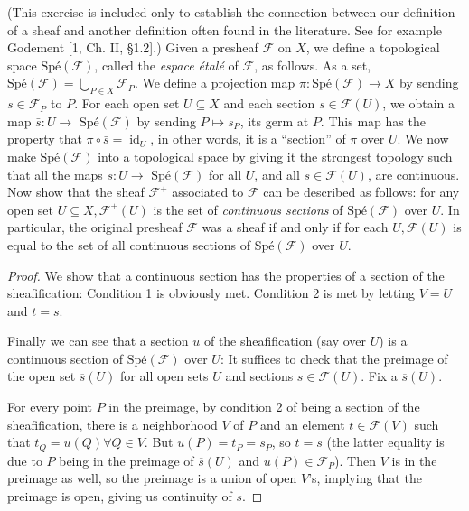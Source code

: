 \begin{exercise}%
	[Espace Etal\'e of a Presheaf.] (This exercise is included only to establish the connection between our definition of a sheaf and another definition often found in the literature. See for example Godement [1, Ch. II, §1.2].) Given a presheaf $\mathscr{F}$ on $X$, we define a topological space $\text{Sp\'e}(\mathscr{F})$, called the \textit{espace \'etal\'e} of $\mathscr{F}$, as follows. As a set, $\text{Sp\'e}(\mathscr{F})=\bigcup_{P \in X} \mathscr{F}_P$. We define a projection map $\pi: \text{Sp\'e}(\mathscr{F}) \to X $ by sending $s \in \mathscr{\mathscr { F }}_P$ to $P$. For each open set $U \subseteq X$ and each section $s \in \mathscr{F}(U)$, we obtain a map $\bar{s}: U \to$ $\text{Sp\'e}(\mathscr{F})$ by sending $P \mapsto s_P$, its germ at $P$. This map has the property that $\pi \circ \bar{s}=\operatorname{id}_U$, in other words, it is a ``section'' of $\pi$ over $U$. We now make $\text{Sp\'e}(\mathscr{F})$ into a topological space by giving it the strongest topology such that all the maps $\bar{s}: U \to$ $\text{Sp\'e}(\mathscr{F})$ for all $U$, and all $s \in \mathscr{F}(U)$, are continuous. Now show that the sheaf $\mathscr{F}^{+}$ associated to $\mathscr{F}$ can be described as follows: for any open set $U \subseteq X, \mathscr{F}^{+}(U)$ is the set of \textit{continuous sections} of $\text{Sp\'e}( \mathscr{F})$ over $U$. In particular, the original presheaf $\mathscr{F}$ was a sheaf if and only if for each $U, \mathscr{F}(U)$ is equal to the set of all continuous sections of $\text{Sp\'e}(\mathscr{F})$ over $U$.
\end{exercise}
\begin{proof}
	We show that a continuous section has the properties of a section of the sheafification:
	Condition 1 is obviously met.
	Condition 2 is met by letting $V = U$ and $t = s $.

	Finally we can see that a section $u $ of the sheafification (say over $U $) is a continuous section of $\text{Sp\'e}(\mathscr{F}) $ over $U $:
	It suffices to check that the preimage of the open set $\overline{s}(U) $ for all open sets $U $ and sections $s \in \mathscr{F}(U) $.
	Fix a $\overline{s}(U)  $.

	For every point $P $ in the preimage, by condition 2 of being a section of the sheafification, there is a neighborhood $V $ of $P $ and an element $t \in \mathscr{F}(V) $ such that $t_Q = u(Q) \forall Q \in V $.
	But $u(P) = t_P = s_P $, so $t = s $ (the latter equality is due to $P $ being in the preimage of $\overline{s}(U)$ and $u(P) \in \mathscr{F}_P $).
	Then $V $ is in the preimage as well, so the preimage is a union of open $V $'s, implying that the preimage is open, giving us continuity of $s $.
\end{proof}

